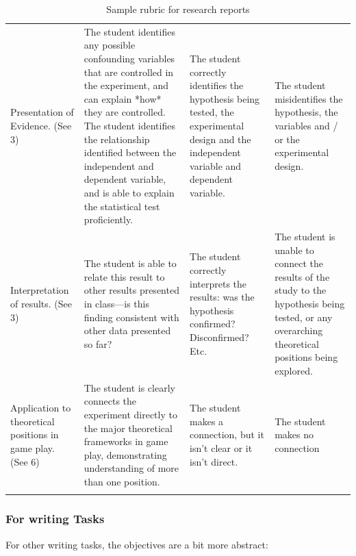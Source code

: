 \begin{refsection}
 \begin{longtable}[!t]{ | P{2cm} | P{3.5cm} | P{3.5cm} | P{3.5cm} |}
\hline
{} &  &  &  \\ \hline

Presentation of Evidence. (See  3)&
The student identifies any possible confounding variables that are controlled in the experiment, and can explain *how* they are controlled. The student identifies the relationship identified between the independent and dependent variable, and is able to explain the statistical test proficiently. & The student correctly identifies the hypothesis being tested, the experimental design and the independent variable and dependent variable.
&The student misidentifies the hypothesis, the variables and / or the experimental design. \\ \hline
Interpretation of results.  (See  3)&
The student is able to relate this result to other results presented in class---is this finding consistent with other data presented so far?&
The student correctly interprets the results: was the hypothesis confirmed? Disconfirmed? Etc.&
The student is unable to connect the results of the study to the hypothesis being tested, or any overarching theoretical positions being explored. \\ \hline
Application to theoretical positions in game play. (See  6) &
The student is clearly connects the experiment directly to the major theoretical frameworks in game play, demonstrating understanding of more than one position.&
The student makes a connection, but it isn’t clear or it isn’t direct.&
The student makes no connection \\ \hline
\caption{Sample rubric for research reports}
\label{table: writingrubric}
\end{longtable} 

\subsubsection{For writing Tasks}
\label{forwritingtasks}

For other writing tasks, the objectives are a bit more abstract:

 \begin{longtable}[!t]{ | P{2cm} | P{3.5cm} | P{3.5cm} | P{3.5cm} |}
\hline
{} &  &  &  \\ \hline


\end{longtable}
\end{refsection}
